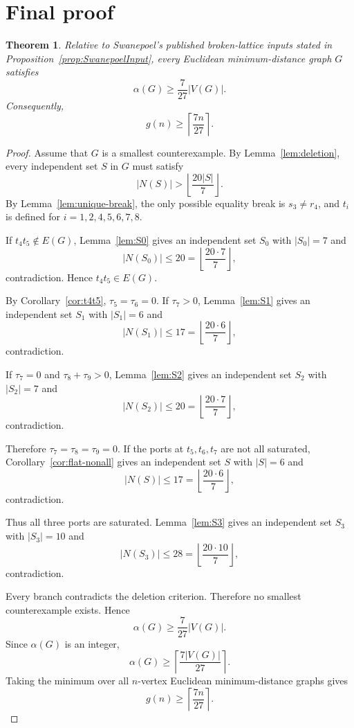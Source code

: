\documentclass[11pt]{article}
\newtheorem{theorem}{Theorem}[section]
\begin{document}
\section{Final proof}

\begin{theorem}\label{thm:main}
Relative to Swanepoel's published broken-lattice inputs stated in Proposition~\ref{prop:SwanepoelInput}, every Euclidean minimum-distance graph $G$ satisfies
\[
 \alpha(G)\ge\frac{7}{27}|V(G)|.
\]
Consequently,
\[
 g(n)\ge \left\lceil\frac{7n}{27}\right\rceil.
\]
\end{theorem}

\begin{proof}
Assume that $G$ is a smallest counterexample. By Lemma~\ref{lem:deletion}, every independent set $S$ in $G$ must satisfy
\[
 |N(S)|>\left\lfloor\frac{20|S|}{7}\right\rfloor.
\]
By Lemma~\ref{lem:unique-break}, the only possible equality break is $s_3\ne r_4$, and $t_i$ is defined for $i=1,2,4,5,6,7,8$.

If $t_4t_5\notin E(G)$, Lemma~\ref{lem:S0} gives an independent set $S_0$ with $|S_0|=7$ and
\[
 |N(S_0)|\le20=\left\lfloor\frac{20\cdot7}{7}\right\rfloor,
\]
contradiction. Hence $t_4t_5\in E(G)$.

By Corollary~\ref{cor:t4t5}, $\tau_5=\tau_6=0$. If $\tau_7>0$, Lemma~\ref{lem:S1} gives an independent set $S_1$ with $|S_1|=6$ and
\[
 |N(S_1)|\le17=\left\lfloor\frac{20\cdot6}{7}\right\rfloor,
\]
contradiction.

If $\tau_7=0$ and $\tau_8+\tau_9>0$, Lemma~\ref{lem:S2} gives an independent set $S_2$ with $|S_2|=7$ and
\[
 |N(S_2)|\le20=\left\lfloor\frac{20\cdot7}{7}\right\rfloor,
\]
contradiction.

Therefore $\tau_7=\tau_8=\tau_9=0$. If the ports at $t_5,t_6,t_7$ are not all saturated, Corollary~\ref{cor:flat-nonall} gives an independent set $S$ with $|S|=6$ and
\[
 |N(S)|\le17=\left\lfloor\frac{20\cdot6}{7}\right\rfloor,
\]
contradiction.

Thus all three ports are saturated. Lemma~\ref{lem:S3} gives an independent set $S_3$ with $|S_3|=10$ and
\[
 |N(S_3)|\le28=\left\lfloor\frac{20\cdot10}{7}\right\rfloor,
\]
contradiction.

Every branch contradicts the deletion criterion. Therefore no smallest counterexample exists. Hence
\[
 \alpha(G)\ge\frac{7}{27}|V(G)|.
\]
Since $\alpha(G)$ is an integer,
\[
 \alpha(G)\ge\left\lceil\frac{7|V(G)|}{27}\right\rceil.
\]
Taking the minimum over all $n$-vertex Euclidean minimum-distance graphs gives
\[
 g(n)\ge \left\lceil\frac{7n}{27}\right\rceil.
\]
\end{proof}
\end{document}
